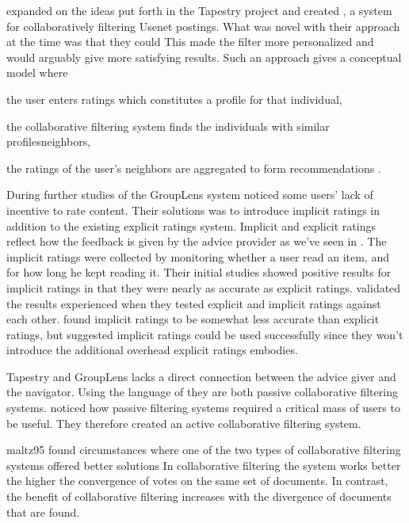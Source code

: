 \citet{resnick94} expanded on the ideas put forth in the Tapestry project
and created ,
a system for collaboratively filtering Usenet postings. What was novel with
their approach at the time was that they could
This made the filter more personalized and would arguably give more
satisfying results. Such an approach gives a conceptual model where
\begin{inparaenum}[(i)]
  \item the user enters ratings which constitutes a profile
    for that individual,
  \item the collaborative filtering system finds
    the individuals with similar profiles\dash{}neighbors,
  \item the ratings of the user's neighbors are aggregated
    to form recommendations \citep[]{herlocker00}.
\end{inparaenum}

During further studies of the GroupLens system \citet[]{konstan97}
noticed some users' lack of incentive to rate content. Their solutions
was to introduce implicit ratings in addition to the existing explicit ratings
system. Implicit and explicit ratings reflect how the feedback is given by the
advice provider as we've seen in
.
The implicit ratings were collected by monitoring whether a user read
an item, and for how long he kept reading it. Their initial studies showed
positive results for implicit ratings in that they were nearly as accurate as
explicit ratings. \citet[]{claypool01} validated the results
\citeauthor{konstan97} experienced when they tested explicit and implicit
ratings against each other. \citeauthor{claypool01} found implicit ratings
to be somewhat less accurate than explicit ratings, but suggested implicit
ratings could be used successfully since they won't introduce the additional
overhead explicit ratings embodies.

Tapestry and GroupLens lacks a direct connection
between the advice giver and the navigator. Using the language of
\citet{dieberger97} they are both passive collaborative filtering systems.
\citet{maltz95} noticed how passive filtering systems required a
critical mass of users to be useful. They therefore created an active
collaborative filtering system.
\begin{fullquote}{maltz95}{%
  found circumstances where one of the two types of collaborative filtering
  systems offered better solutions}
    In  collaborative filtering the system works better the higher
    the convergence of votes on the same set of documents. In contrast, the
    benefit of  collaborative filtering increases with the
    divergence of documents that are found.
\end{fullquote}

